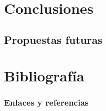 \documentclass[a4paper, oneside, 12pt]{book}
\begin{document}
	\pagebreak
	
	\chapter{Conclusiones}
	
	\section{Propuestas futuras}
	
	\pagebreak
	
	\chapter{Bibliografía}
	
	\subsection*{Enlaces y referencias}
	
\end{document}
